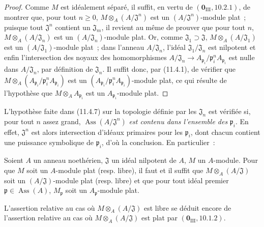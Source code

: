 \begin{proof}
Comme $M$ est idéalement séparé, il suffit, en vertu de
$(\mathbf 0_{\mathrm{III}},10.2.1)$, de montrer que, pour tout $n\geq0$,
$M\otimes_A(A/\mathfrak J^n)$ est un $(A/\mathfrak J^n)$-module plat~;
puisque tout $\mathfrak J^n$ contient un $\mathfrak J_m$, il revient au même
de prouver que pour tout $n$, $M\otimes_A(A/\mathfrak J_n)$ est un
$(A/\mathfrak J_n)$-module plat. Or, comme
$\mathfrak J_1\supset\mathfrak J$, $M\otimes_A(A/\mathfrak J_1)$ est un
$(A/\mathfrak J_1)$-module plat~; dans l'anneau $A/\mathfrak J_n$, l'idéal
$\mathfrak J_1/\mathfrak J_n$ est nilpotent et enfin l'intersection des noyaux
des homomorphismes
$A/\mathfrak J_n\longrightarrow
A_{\mathfrak p_i}/\mathfrak p_i^nA_{\mathfrak p_i}$
est nulle dans $A/\mathfrak J_n$, par définition de $\mathfrak J_n$. Il suffit
donc, par (11.4.1), de vérifier que
$M\otimes_A(A_{\mathfrak p_i}/\mathfrak p_i^nA_{\mathfrak p_i})$
est un $(A_{\mathfrak p_i}/\mathfrak p_i^nA_{\mathfrak p_i})$-module plat, ce
qui résulte de l'hypothèse que $M\otimes_AA_{\mathfrak p_i}$ est un
$A_{\mathfrak p_i}$-module plat.
\end{proof}

\begin{remark}[11.4.8]
\label{IV.11.4.8-fr}
L'hypothèse faite dans (11.4.7) sur la topologie définie par les
$\mathfrak J_n$ est vérifiée si, pour tout $n$ assez grand,
$\operatorname{Ass}(A/\mathfrak J^n)$ \emph{est contenu dans l'ensemble des}
$\mathfrak p_i$. En effet, $\mathfrak J^n$ est alors intersection d'idéaux
primaires pour les $\mathfrak p_i$, dont chacun contient une puissance
symbolique de $\mathfrak p_i$, d'où la conclusion. En particulier~:
\end{remark}

\begin{corollary}[11.4.9]
\label{IV.11.4.9-fr}
Soient $A$ un anneau noethérien, $\mathfrak J$ un idéal nilpotent de $A$, $M$
un $A$-module. Pour que $M$ soit un $A$-module plat \textup{(resp.} libre), il faut et
il suffit que $M\otimes_A(A/\mathfrak J)$ soit un $(A/\mathfrak J)$-module
plat \textup{(resp.} libre) et que pour tout idéal premier
$\mathfrak p\in\operatorname{Ass}(A)$, $M_\mathfrak p$ soit un
$A_\mathfrak p$-module plat.
\end{corollary}


L'assertion relative au cas où $M\otimes_A(A/\mathfrak J)$ est libre se déduit
encore de l'assertion relative au cas où $M\otimes_A(A/\mathfrak J)$ est plat
par $(\mathbf 0_{\mathrm{III}},10.1.2)$.

